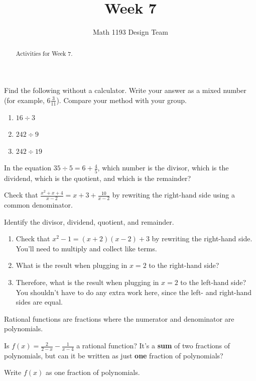 \documentclass[noauthor,noinstructornotes]{ximera}
\title{Week 7}
\author{Math 1193 Design Team}
\begin{document}
\begin{abstract}
    Activities for Week 7.
\end{abstract}
\maketitle

\begin{problem}
Find the following without a calculator. Write your answer as a 
mixed number (for example, \(6 \frac{3}{11}\)). Compare your method 
with your group.

\begin{enumerate}
    \item \(16 \div 3\)
    \item \(242 \div 9\)
    \item \(242 \div 19\)
\end{enumerate}
\end{problem}

\begin{problem}
In the equation \(35 \div 5 = 6 + \frac{4}{5}\), which number
is the divisor, which is the dividend, which is the quotient, and 
which is the remainder?
\end{problem}

\begin{problem}
Check that \(\frac{x^2 + x + 4}{x - 2} = x + 3 + \frac{10}{x - 2}\) by
rewriting the right-hand side using a common denominator. 

Identify the divisor, dividend, quotient, and remainder.

\end{problem}

\begin{problem}
\begin{enumerate}
    \item Check that \(x^2 - 1 = (x + 2)(x - 2) + 3\) by rewriting the right-hand
    side. You'll need to multiply and collect like terms.
    \item What is the result when plugging in \(x = 2\) to the right-hand side?
    \item Therefore, what is the result when plugging in \(x = 2\) to the left-hand
    side? You shouldn't have to do any extra work here, since the
    left- and right-hand sides are equal.
\end{enumerate}

\end{problem}

\begin{problem}
Rational functions are fractions where the numerator and
denominator are polynomials.

Is \(f(x) = \frac{2}{2 - x} - \frac{1}{x - 4}\) a rational function?
It's a \textbf{sum} of two fractions of polynomials, but can it be
written as just \textbf{one} fraction of polynomials?

Write \(f(x)\) as one fraction of polynomials.
\end{problem}
\end{document}
